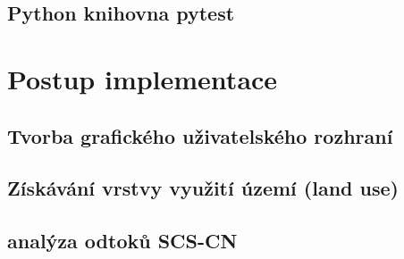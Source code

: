 \documentclass[a4paper,oneside,12pt]{book}
\begin{document}
\section{Python knihovna pytest} \label{pytest}

\chapter{Postup implementace} \label{implementace}
\section{Tvorba grafického uživatelského rozhraní} \label{gui}
\section{Získávání vrstvy využití území (land use)} \label{landuse}
\section{analýza odtoků SCS-CN} \label{CN}
\clearpage  %
  \label{zdroje}
\end{document}
